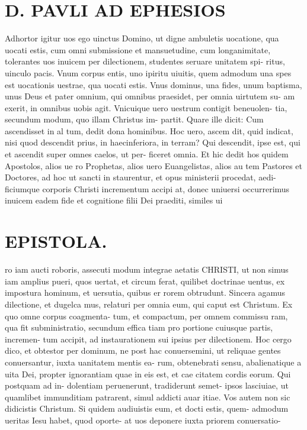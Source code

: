 \documentclass{article}
\begin{document}
\begin{pages}
\section*{D. PAVLI AD EPHESIOS }
\marginpar{[ p.2. ]}
\marginpar{[ p.3.  ]}
\marginpar{[ p.4.  ]}\pstart Adhortor igitur uos ego uinctus Domino, ut digne ambuletis uocatione, qua uocati estis, cum omni submissione et mansuetudine, cum longanimitate, tolerantes uos inuicem per dilectionem, studentes seruare unitatem spi- ritus, uinculo pacis.  \pend\pstart Vnum corpus entis, uno ipiritu uiuitis, quem admodum una spes est uocationis uestrae, qua uocati estis. Vnus dominus, una fides, unum baptisma, unus Deus et pater omnium, qui omnibus praesidet, per omnia uirtutem su- am exerit, in omnibus uobis agit.  \pend\pstart Vnicuique  uero uestrum contigit beneuolen- tia, secundum modum, quo illam Christus im- partit. Quare ille dicit: Cum ascendisset in al tum, dedit dona hominibus. Hoc uero, ascem dit, quid indicat, nisi quod descendit prius, in haecinferiora, in terram? Qui descendit, ipse est, qui et ascendit super omnes caelos, ut per- ficeret omnia.  \pend\pstart Et hic dedit hos quidem Apostolos, alios ue ro Prophetas, alios uero Euangelistas, alios au tem Pastores et Doctores, ad hoc ut sancti in staurentur, et opus ministerii procedat, aedi- ficiumque  corporis Christi incrementum accipi at, donec uniuersi occurrerimus inuicem eadem fide et cognitione filii Dei praediti, similes ui  \pend
\section*{EPISTOLA.  }
\marginpar{[ p.13 ]}
\marginpar{[ p.5.  ]}
\marginpar{[ p.6.  ]}
\marginpar{[ p.7.  ]}\pstart ro iam aucti roboris, assecuti modum integrae aetatis CHRISTI, ut non simus iam amplius pueri, quos uertat, et circum ferat, quilibet doctrinae uentus, ex impostura hominum, et uersutia, quibus er rorem obtrudunt.  \pend\pstart Sincera agamus dilectione, et dugelca mus, relaturi per omnia eum, qui caput est Christum. Ex quo omne corpus coagmenta- tum, et compactum, per omnem commissu ram, qua fit subministratio, secundum effica tiam pro portione cuiusque  partis, incremen- tum accipit, ad instaurationem sui ipsius per dilectionem.   \pend\pstart Hoc cergo dico, et obtestor per dominum, ne post hac conuersemini, ut reliquae gentes conuersantur, iuxta uanitatem mentis ea- rum, obtenebrati sensu, abalienatique  a uita Dei, propter ignorantiam quae in eis est, et cae citatem cordis eorum. Qui postquam ad in- dolentiam peruenerunt, tradiderunt semet- ipsos lasciuiae, ut quamlibet immunditiam patrarent, simul addicti auar itiae.  \pend\pstart Vos autem non sic didicistis Christum. Si quidem audiuistis eum, et docti estis, quem- admodum ueritas Iesu habet, quod oporte- at uos deponere iuxta priorem conuersatio-  \pend

\end{pages}
\end{document}
